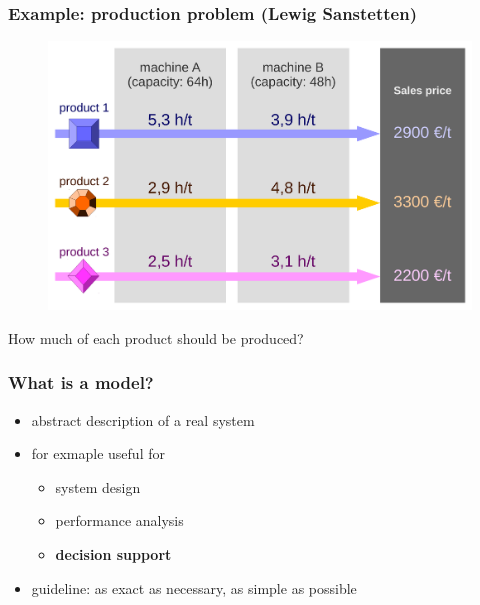 
\begin{frame}
 \frametitle{Example: production problem (Lewig Sanstetten)}
 \begin{figure}
  \centering
  \includegraphics[width=\linewidth]{Bilder/LewigSanstetten}
 \end{figure}
 
 How much of each product should be produced?
\end{frame}

\begin{frame}
 \frametitle{What is a model?}
 \begin{itemize}
  \item abstract description of a real system
  \item for exmaple useful for
  \begin{itemize}
   \item system design
   \item performance analysis
   \item \textbf{decision support}
  \end{itemize}
  \item guideline: as exact as necessary, as simple as possible
 \end{itemize}
\end{frame}


